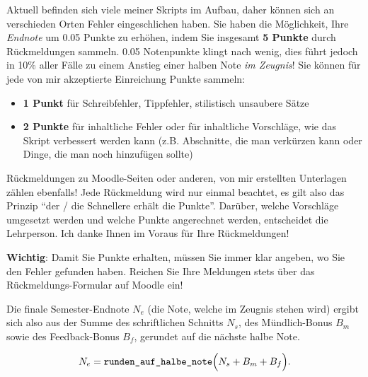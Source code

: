 \begin{textBox}[title=\emoji{speech-balloon} Bonus 2: Rückmeldungen zu den Skripts und Unterlagen]
	Aktuell befinden sich viele meiner Skripts im Aufbau, daher können sich an verschieden Orten Fehler eingeschlichen haben. Sie haben die Möglichkeit, Ihre \textit{Endnote} um 0.05 Punkte zu erhöhen, indem Sie insgesamt \textbf{5 Punkte} durch Rückmeldungen sammeln. 0.05 Notenpunkte klingt nach wenig, dies führt jedoch in 10\% aller Fälle zu einem Anstieg einer halben Note \textit{im Zeugnis}! Sie können für jede von mir akzeptierte Einreichung Punkte sammeln:
	\begin{itemize}
		\item \textbf{1 Punkt} für Schreibfehler, Tippfehler, stilistisch unsaubere Sätze
		\item \textbf{2 Punkte} für inhaltliche Fehler oder für inhaltliche Vorschläge, wie das Skript verbessert werden kann (z.B. Abschnitte, die man verkürzen kann oder Dinge, die man noch hinzufügen sollte)
	\end{itemize}

	Rückmeldungen zu Moodle-Seiten oder anderen, von mir erstellten Unterlagen zählen ebenfalls! Jede Rückmeldung wird nur einmal beachtet, es gilt also das Prinzip \enquote{der / die Schnellere erhält die Punkte}. Darüber, welche Vorschläge umgesetzt werden und welche Punkte angerechnet werden, entscheidet die Lehrperson. Ich danke Ihnen im Voraus für Ihre Rückmeldungen!
	
	\textbf{Wichtig}: Damit Sie Punkte erhalten, müssen Sie immer klar angeben, wo Sie den Fehler gefunden haben. Reichen Sie Ihre Meldungen stets über das Rückmeldungs-Formular auf Moodle ein!
\end{textBox}

Die finale Semester-Endnote $N_e$ (die Note, welche im Zeugnis stehen wird) ergibt sich also aus der Summe des schriftlichen Schnitts $N_s$, des Mündlich-Bonus $B_m$ sowie des Feedback-Bonus $B_f$, gerundet auf die nächste halbe Note.

\[N_e=\text{\texttt{runden\_auf\_halbe\_note}}\Big(N_s+B_m+B_f\Big).\]
